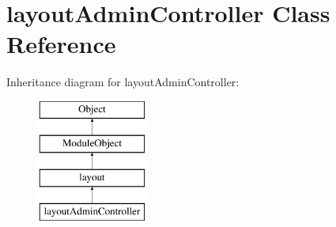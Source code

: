 \hypertarget{classlayoutAdminController}{\section{layout\-Admin\-Controller Class Reference}
\label{classlayoutAdminController}
}
Inheritance diagram for layout\-Admin\-Controller\-:\begin{figure}[H]
\begin{center}
\leavevmode
\includegraphics[height=4.000000cm]{classlayoutAdminController}
\end{center}
\end{figure}
